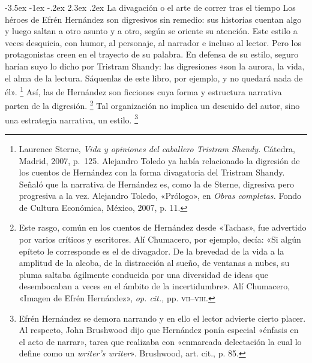 \documentclass[14pt,twoside,final]{extbook} %
\makeatletter
\let\oldfootnote\footnote
\renewcommand\footnote[1]{%
\oldfootnote{\hspace{1mm}#1}}
\renewcommand\section{\@startsection {section}{1}{\z@}%
                                     {-3.5ex \@plus -1ex \@minus -.2ex}%
                                     {2.3ex \@plus .2ex}%
                                     {\normalfont\large\bfseries\sc}}
\makeatother
\begin{document}
\section{La divagación o el arte de correr tras el tiempo}\label{sec:la-divagacion-o-el-arte-de-correr-tras-el-tiempo}
Los héroes de Efrén Hernández son digresivos sin remedio: sus historias cuentan algo y luego saltan a otro asunto y a otro, según se oriente su atención. Este estilo a veces desquicia, con humor, al personaje, al narrador e incluso al lector. Pero los protagonistas creen en el trayecto de su palabra. En defensa de su estilo, seguro harían suyo lo dicho por Tristram Shandy: las digresiones «son la aurora, la vida, el alma de la lectura. Sáquenlas de este libro, por ejemplo, y no quedará nada de él».\footnote{Laurence Sterne, \emph{Vida y opiniones del caballero Tristram Shandy.} Cátedra, Madrid, 2007, p.~125. Alejandro Toledo ya había relacionado la digresión de los cuentos de Hernández con la forma divagatoria del Tristram Shandy. Señaló que la narrativa de Hernández es, como la de Sterne, digresiva pero progresiva a la vez.  Alejandro Toledo, «Prólogo», en \emph{Obras completas.} Fondo de Cultura Económica, México, 2007, p. 11.} Así, las de Hernández son ficciones cuya forma y estructura narrativa parten de la digresión.\footnote{Este rasgo, común en los cuentos de Hernández desde «Tachas», fue advertido por varios críticos y escritores. Alí Chumacero, por ejemplo, decía: «Si algún epíteto le corresponde es el de divagador. De la brevedad de la vida a la amplitud de la alcoba, de la distracción al sueño, de ventanas a nubes, su pluma saltaba ágilmente conducida por una diversidad de ideas que desembocaban a veces en el ámbito de la incertidumbre». Alí Chumacero, «Imagen de Efrén Hernández», \emph{op. cit.,} pp. \textsc{vii--viii}.} Tal organización no implica un descuido del autor, sino una estrategia narrativa, un estilo.\footnote{Efrén Hernández se demora narrando y en ello el lector advierte cierto placer. Al respecto, John Brushwood dijo que Hernández ponía especial «énfasis en el acto de narrar», tarea que realizaba con «enmarcada delectación la cual lo define como un \emph{writer’s writer}». Brushwood, art. cit., p. 85.}
\end{document}
